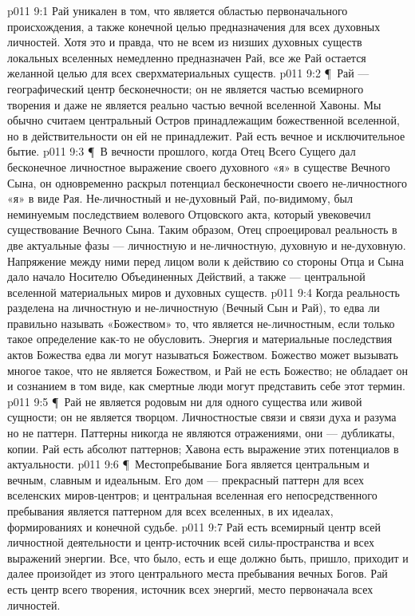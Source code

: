 \vs p011 9:1 Рай уникален в том, что является областью первоначального происхождения, а также конечной целью предназначения для всех духовных личностей. Хотя это и правда, что не всем из низших духовных существ локальных вселенных немедленно предназначен Рай, все же Рай остается желанной целью для всех сверхматериальных существ.
\vs p011 9:2 \P\ Рай --- географический центр бесконечности; он не является частью всемирного творения и даже не является реально частью вечной вселенной Хавоны. Мы обычно считаем центральный Остров принадлежащим божественной вселенной, но в действительности он ей не принадлежит. Рай есть вечное и исключительное бытие.
\vs p011 9:3 \P\ В вечности прошлого, когда Отец Всего Сущего дал бесконечное личностное выражение своего духовного «я» в существе Вечного Сына, он одновременно раскрыл потенциал бесконечности своего не\hyp{}личностного «я» в виде Рая. Не\hyp{}личностный и не\hyp{}духовный Рай, по\hyp{}видимому, был неминуемым последствием волевого Отцовского акта, который увековечил существование Вечного Сына. Таким образом, Отец спроецировал реальность в две актуальные фазы --- личностную и не\hyp{}личностную, духовную и не\hyp{}духовную. Напряжение между ними перед лицом воли к действию со стороны Отца и Сына дало начало Носителю Объединенных Действий, а также --- центральной вселенной материальных миров и духовных существ.
\vs p011 9:4 Когда реальность разделена на личностную и не\hyp{}личностную (Вечный Сын и Рай), то едва ли правильно называть «Божеством» то, что является не\hyp{}личностным, если только такое определение как\hyp{}то не обусловить. Энергия и материальные последствия актов Божества едва ли могут называться Божеством. Божество может вызывать многое такое, что не является Божеством, и Рай не есть Божество; не обладает он и сознанием в том виде, как смертные люди могут представить себе этот термин.
\vs p011 9:5 \P\ Рай не является родовым ни для одного существа или живой сущности; он не является творцом. Личностностые связи и связи духа и разума  но не паттерн. Паттерны никогда не являются отражениями, они --- дубликаты, копии. Рай есть абсолют паттернов; Хавона есть выражение этих потенциалов в актуальности.
\vs p011 9:6 \P\ Местопребывание Бога является центральным и вечным, славным и идеальным. Его дом --- прекрасный паттерн для всех вселенских миров\hyp{}центров; и центральная вселенная его непосредственного пребывания является паттерном для всех вселенных, в их идеалах, формированиях и конечной судьбе.
\vs p011 9:7 Рай есть всемирный центр всей личностной деятельности и центр\hyp{}источник всей силы\hyp{}пространства и всех выражений энергии. Все, что было, есть и еще должно быть, пришло, приходит и далее произойдет из этого центрального места пребывания вечных Богов. Рай есть центр всего творения, источник всех энергий, место первоначала всех личностей.

